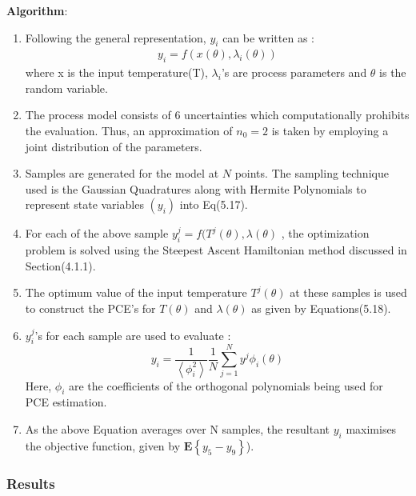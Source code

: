 \documentclass[3p,times,authoryear]{elsarticle}
\begin{document}
\textbf{Algorithm}:
\begin{enumerate}

\item Following the general representation, $y_{i}$ can be written as :
\begin{align*}
y_{i} = f(x(\theta),\lambda_{i}(\theta))
\end{align*}
where x is the input temperature(T), $\lambda_{i}$'s are process parameters and $\theta$ is the random variable.
\item The process model consists of 6 uncertainties which computationally prohibits the evaluation. Thus, an approximation of $n_{0} = 2$ is taken by employing a joint distribution of the parameters.
\item Samples are generated for the model at $N$ points. The sampling technique used is the Gaussian Quadratures along with Hermite Polynomials to represent state variables $(y_{i})$ into Eq(5.17).

\item For each of the above sample $y^{j}_{i} = f(T^{j}(\theta),\lambda(\theta) $ ,  the optimization problem is solved using the Steepest Ascent Hamiltonian method discussed in Section(4.1.1).

\item The optimum value of the input temperature $T^{j}(\theta)$ at these samples is used to construct the PCE's for $T(\theta)$ and $\lambda(\theta)$ as given by Equations(5.18).

\item $y^{j}_{i}$'s for each sample are used to evaluate :
\begin{equation}
y_{i} = \frac{1}{\left\langle \phi^{2}_{i}\right\rangle }\frac{1}{N} \sum_{j=1}^{N} y^{j}\phi_{i}(\theta)
\end{equation}
Here, $\phi_{i}$ are the coefficients of the orthogonal polynomials being used for PCE estimation.  

\item As the above Equation averages over N samples, the resultant $y_{i}$ maximises the objective function, given by $ \mathbf{E} \left\lbrace  y_{5}-y_{9} \right\rbrace $). 

\end{enumerate} 

\subsubsection{Results}
\end{document}

